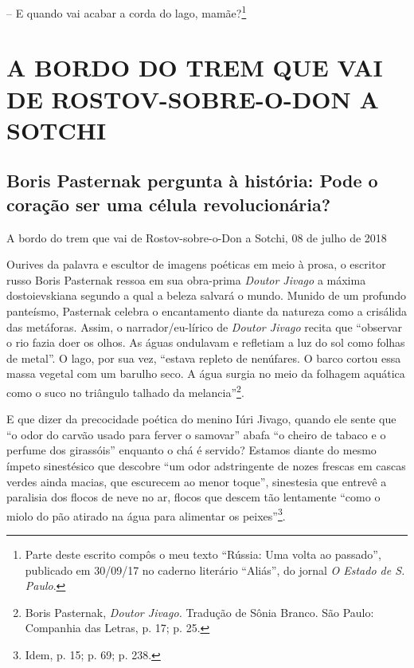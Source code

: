 -- E quando vai acabar a corda do lago, mamãe?\footnote{Parte deste
  escrito compôs o meu texto ``Rússia: Uma volta ao passado'', publicado
  em 30/09/17 no caderno literário ``Aliás'', do jornal \emph{O Estado
  de S. Paulo}.}

\newpage
{}
\part*{A BORDO DO TREM QUE VAI DE ROSTOV-SOBRE-O-DON A SOTCHI}

\chapter*{Boris Pasternak pergunta à história: Pode o coração ser uma célula revolucionária?}

\begin{flushright}
A bordo do trem que vai de Rostov-sobre-o-Don a Sotchi, 08 de julho de
2018
\end{flushright}

Ourives da palavra e escultor de imagens poéticas em meio à prosa, o
escritor russo Boris Pasternak ressoa em sua obra-prima \emph{Doutor
Jivago} a máxima dostoievskiana segundo a qual a beleza salvará o mundo.
Munido de um profundo panteísmo, Pasternak celebra o encantamento diante
da natureza como a crisálida das metáforas. Assim, o narrador/eu-lírico
de \emph{Doutor Jivago} recita que ``observar o rio fazia doer os olhos.
As águas ondulavam e refletiam a luz do sol como folhas de metal''. O
lago, por sua vez, ``estava repleto de nenúfares. O barco cortou essa
massa vegetal com um barulho seco. A água surgia no meio da folhagem
aquática como o suco no triângulo talhado da melancia''\footnote{Boris
  Pasternak, \emph{Doutor Jivago.} Tradução de Sônia Branco. São Paulo:
  Companhia das Letras, p. 17; p. 25.}.

E que dizer da precocidade poética do menino Iúri Jivago, quando ele
sente que ``o odor do carvão usado para ferver o samovar'' abafa ``o
cheiro de tabaco e o perfume dos girassóis'' enquanto o chá é servido?
Estamos diante do mesmo ímpeto sinestésico que descobre ``um odor
adstringente de nozes frescas em cascas verdes ainda macias, que
escurecem ao menor toque'', sinestesia que entrevê a paralisia dos
flocos de neve no ar, flocos que descem tão lentamente ``como o miolo do
pão atirado na água para alimentar os peixes''\footnote{Idem, p. 15; p.
  69; p. 238.}.

